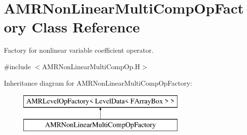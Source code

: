 \hypertarget{class_a_m_r_non_linear_multi_comp_op_factory}{\section{A\-M\-R\-Non\-Linear\-Multi\-Comp\-Op\-Factory Class Reference}
\label{class_a_m_r_non_linear_multi_comp_op_factory}
}


Factory for nonlinear variable coefficient operator.  




{\ttfamily \#include $<$A\-M\-R\-Non\-Linear\-Multi\-Comp\-Op.\-H$>$}

Inheritance diagram for A\-M\-R\-Non\-Linear\-Multi\-Comp\-Op\-Factory\-:\begin{figure}[H]
\begin{center}
\leavevmode
\includegraphics[height=2.000000cm]{class_a_m_r_non_linear_multi_comp_op_factory}
\end{center}
\end{figure}

